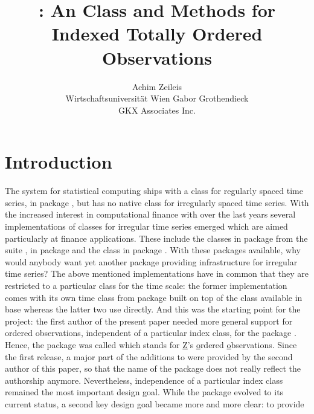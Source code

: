 \documentclass[article,nojss]{jss}
\author{Achim Zeileis\\Wirtschaftsuniversit\"at Wien \And
        Gabor Grothendieck\\GKX Associates Inc.}
\title{\pkg{zoo}: An \proglang{S3} Class and Methods for
  Indexed Totally Ordered Observations}
\begin{document}



\section{Introduction} \label{sec:intro}

The  system for statistical computing
\citep[\url{http://www.R-project.org/}]{zoo:R:2008}
ships with a class for regularly spaced time series,
 in package , but has no native class for
irregularly spaced time series. With the increased interest in
computational finance with  over the last years
several implementations of classes for irregular time series 
emerged which are aimed particularly at finance applications.
These include the  classes 
in package  from the  suite \citep{zoo:Rmetrics:2008},
 in package  \citep{zoo:its:2004}
and the  class  in package  \citep{zoo:tseries:2007}.
With these packages available, why would anybody want yet another 
package providing infrastructure for irregular time series?
The above mentioned implementations have in common that they are restricted to a particular
class for the time scale: the former implementation comes with its own time class
 from package  built on top of the  class
available in base  whereas the latter two use  directly.
And this was the starting point for the  project: the first author
of the present paper needed
more general support for ordered observations, independent of a particular
index class, for the package 
\citep{zoo:Zeileis+Leisch+Hornik:2002}. Hence, the package was called
 which stands for \underline{Z}'s \underline{o}rdered \underline{o}bservations.
Since the first release, a major part of the additions to 
were provided by the second author of this paper, so that the name
of the package does not really reflect the authorship anymore.
Nevertheless, independence of a particular index class remained
the most important design goal. While the package evolved to its current
status, a second key design goal became more and more clear: to provide
\end{document}
